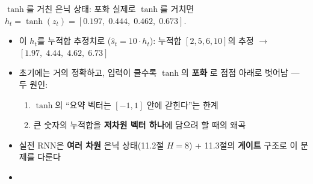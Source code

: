 \begin{frame}{$\tanh$를 거친 은닉 상태: 포화}
  실제로 $\tanh$를 거치면 $h_t = \tanh(z_t) =
  [0.197,\; 0.444,\; 0.462,\; 0.673]$.
  \begin{itemize}
    \item 이 $h_t$를 누적합 추정치로 ($\hat{s}_t = 10 \cdot h_t$):
      누적합 $[2, 5, 6, 10]$의 추정 $\to$
      $[1.97,\; 4.44,\; 4.62,\; 6.73]$
    \item 초기에는 거의 정확하고, 입력이 클수록 $\tanh$의 \textbf{포화}
      로 점점 아래로 벗어남 --- 두 원인:
    \begin{enumerate}
      \item $\tanh$의 ``요약 벡터는 $[-1, 1]$ 안에 갇힌다''는 한계
      \item 큰 숫자의 누적합을 \textbf{저차원 벡터 하나}에 담으려
        할 때의 왜곡
    \end{enumerate}
    \item 실전 RNN은 \textbf{여러 차원} 은닉 상태(11.2절 $H=8$) +
      11.3절의 \textbf{게이트} 구조로 이 문제를 다룬다
    \item {}
  \end{itemize}
\end{frame}
